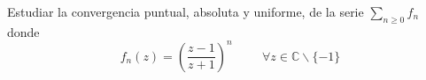 \begin{ejer}
	Estudiar la convergencia puntual, absoluta y uniforme, de la serie $\sum_{n\geq 0} f_n$ donde
	$$ f_n(z) = \left( \frac{z-1}{z+1} \right)^n\hspace{1cm} \forall z\in\mathbb{C}\backslash\{-1\} $$
\end{ejer}

\begin{comment}
Idea:

llamar w a (w-1)/(z-1), y mirar cuando la función tiene imagen que cae en el disco de centro 0 y radio 1, afinar para saber cuando un subconjunto de C po esta función cae dentro de un subconjunto compacto donde el sumatorio converja
\end{comment}
